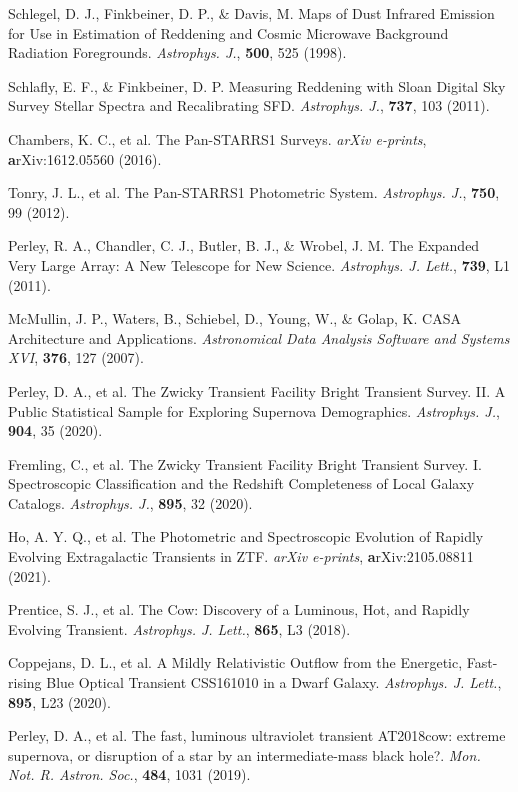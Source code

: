 \documentclass{nature_plusfigure}
\newcommand{\mn}{{Mon. Not. R. Astron. Soc.}}
\newcommand{\mnras}{\mn}
\newcommand{\apj}{{Astrophys. J.}}
\newcommand{\apjl}{{Astrophys. J. Lett.}}
\begin{document}
\begin{methods}
\begin{thebibliography}{10}
  Schlegel, D. J., Finkbeiner, D. P., \& Davis, M. Maps of Dust Infrared Emission for Use in Estimation of Reddening and Cosmic Microwave Background Radiation Foregrounds. \emph{\apj}, \textbf{500}, 525 (1998). 

  Schlafly, E. F., \& Finkbeiner, D. P. Measuring Reddening with Sloan Digital Sky Survey Stellar Spectra and Recalibrating SFD. \emph{\apj}, \textbf{737}, 103 (2011). 

 Chambers, K. C., et al. The Pan-STARRS1 Surveys. \emph{arXiv e-prints}, \textbf arXiv:1612.05560 (2016). 

 Tonry, J. L., et al. The Pan-STARRS1 Photometric System. \emph{\apj}, \textbf{750}, 99 (2012). 

 Perley, R. A., Chandler, C. J., Butler, B. J., \& Wrobel, J. M. The Expanded Very Large Array: A New Telescope for New Science. \emph{\apjl}, \textbf{739}, L1 (2011). 

 McMullin, J. P., Waters, B., Schiebel, D., Young, W., \& Golap, K. CASA Architecture and Applications. \emph{Astronomical Data Analysis Software and Systems XVI}, \textbf{376}, 127 (2007). 

 Perley, D. A., et al. The Zwicky Transient Facility Bright Transient Survey. II. A Public Statistical Sample for Exploring Supernova Demographics. \emph{\apj}, \textbf{904}, 35 (2020). 

 Fremling, C., et al. The Zwicky Transient Facility Bright Transient Survey. I. Spectroscopic Classification and the Redshift Completeness of Local Galaxy Catalogs. \emph{\apj}, \textbf{895}, 32 (2020).

 Ho, A. Y. Q., et al. The Photometric and Spectroscopic Evolution of Rapidly Evolving Extragalactic Transients in ZTF. \emph{arXiv e-prints}, \textbf arXiv:2105.08811 (2021). 

 Prentice, S. J., et al. The Cow: Discovery of a Luminous, Hot, and Rapidly Evolving Transient. \emph{\apjl}, \textbf{865}, L3 (2018). 

 Coppejans, D. L., et al. A Mildly Relativistic Outflow from the Energetic, Fast-rising Blue Optical Transient CSS161010 in a Dwarf Galaxy. \emph{\apjl}, \textbf{895}, L23 (2020). 

 Perley, D. A., et al. The fast, luminous ultraviolet transient AT2018cow: extreme supernova, or disruption of a star by an intermediate-mass black hole?. \emph{\mnras}, \textbf{484}, 1031 (2019). 


\end{thebibliography}
\end{methods}
\end{document}
